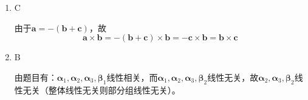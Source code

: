 \begin{enumerate}
    \item C

    由于\(\boldsymbol{a} = -(\boldsymbol{b} + \boldsymbol{c})\)，故\[\boldsymbol{a} \times  \boldsymbol{b} = -(\boldsymbol{b} + \boldsymbol{c}) \times \boldsymbol{b} =-\boldsymbol{c} \times \boldsymbol{b}=\boldsymbol{b} \times \boldsymbol{c} \]

    \item B

    由题目有：\(\boldsymbol{\alpha}_1, \boldsymbol{\alpha}_2, \boldsymbol{\alpha}_3 , \boldsymbol{\beta}_1\)线性相关，而\(\boldsymbol{\alpha}_1, \boldsymbol{\alpha}_2, \boldsymbol{\alpha}_3 , \boldsymbol{\beta}_2\)线性无关，故\(\boldsymbol{\alpha}_2, \boldsymbol{\alpha}_3 , \boldsymbol{\beta}_2\)线性无关（整体线性无关则部分组线性无关）。
\end{enumerate}